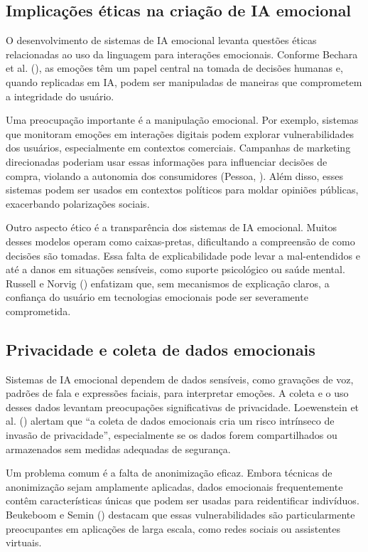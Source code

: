 \documentclass[a4paper,12pt]{report}
\begin{document}
	\subsection{Implicações éticas na criação de IA emocional}
	
	O desenvolvimento de sistemas de IA emocional levanta questões éticas relacionadas ao uso da linguagem para interações emocionais. Conforme Bechara et al. (\citeyear{bechara2000}), as emoções têm um papel central na tomada de decisões humanas e, quando replicadas em IA, podem ser manipuladas de maneiras que comprometem a integridade do usuário.
	
	Uma preocupação importante é a manipulação emocional. Por exemplo, sistemas que monitoram emoções em interações digitais podem explorar vulnerabilidades dos usuários, especialmente em contextos comerciais. Campanhas de marketing direcionadas poderiam usar essas informações para influenciar decisões de compra, violando a autonomia dos consumidores (Pessoa, \citeyear{pessoa2008}). Além disso, esses sistemas podem ser usados em contextos políticos para moldar opiniões públicas, exacerbando polarizações sociais.
	
	Outro aspecto ético é a transparência dos sistemas de IA emocional. Muitos desses modelos operam como caixas-pretas, dificultando a compreensão de como decisões são tomadas. Essa falta de explicabilidade pode levar a mal-entendidos e até a danos em situações sensíveis, como suporte psicológico ou saúde mental. Russell e Norvig (\citeyear{russell2020}) enfatizam que, sem mecanismos de explicação claros, a confiança do usuário em tecnologias emocionais pode ser severamente comprometida.
	
	\subsection{Privacidade e coleta de dados emocionais}
	
	Sistemas de IA emocional dependem de dados sensíveis, como gravações de voz, padrões de fala e expressões faciais, para interpretar emoções. A coleta e o uso desses dados levantam preocupações significativas de privacidade. Loewenstein et al. (\citeyear{loewenstein2001}) alertam que “a coleta de dados emocionais cria um risco intrínseco de invasão de privacidade”, especialmente se os dados forem compartilhados ou armazenados sem medidas adequadas de segurança.
	
	Um problema comum é a falta de anonimização eficaz. Embora técnicas de anonimização sejam amplamente aplicadas, dados emocionais frequentemente contêm características únicas que podem ser usadas para reidentificar indivíduos. Beukeboom e Semin (\citeyear{beukeboom2006}) destacam que essas vulnerabilidades são particularmente preocupantes em aplicações de larga escala, como redes sociais ou assistentes virtuais.
	
\end{document}
